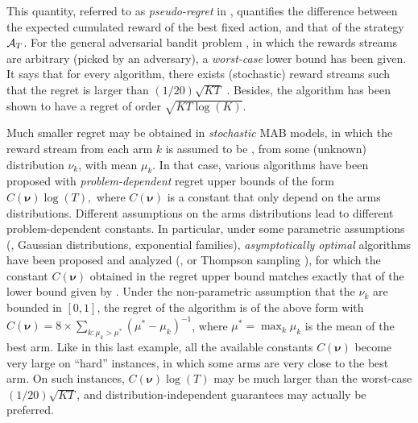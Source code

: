 \documentclass[12pt]{colt2018} %
\begin{document}
This quantity, referred to as \emph{pseudo-regret} in \cite{Bubeck12}, quantifies the difference between the expected cumulated reward of the best fixed action, and that of the strategy $\mathcal{A}_T$.
For the general adversarial bandit problem \citep{Auer02NonStochastic}, in which the rewards streams are arbitrary (picked by an adversary), a \emph{worst-case} lower bound has been given.
It says that for every algorithm, there exists (stochastic) reward streams such that the regret is larger than $(1/20)\sqrt{KT}$
\citep{Auer02NonStochastic}.
Besides, the \ExpThree{} algorithm has been shown to have a regret of order $\sqrt{KT\log(K)}$.


Much smaller regret may be obtained in \emph{stochastic} MAB models, in which the reward stream from each arm $k$ is assumed to be \iid, from some (unknown) distribution $\nu_k$, with mean $\mu_k$.
In that case, various algorithms have been proposed with \emph{problem-dependent} regret upper bounds of the form $C(\bm\nu) \log(T),$ where $C(\bm\nu)$ is a constant that only depend on the arms distributions.
Different assumptions on the arms distributions lead to different problem-dependent constants.
In particular, under some parametric assumptions (\eg, Gaussian distributions, exponential families), \emph{asymptotically optimal} algorithms have been proposed and analyzed (\eg, \KLUCB{} \citep{KLUCBJournal} or Thompson sampling \citep{AgrawalGoyal11,Kaufmann12Thompson}), for which the constant $C(\bm\nu)$ obtained in the regret upper bound matches exactly that of the lower bound given by \cite{LaiRobbins85}.
Under the non-parametric assumption that the $\nu_k$ are bounded in $[0,1]$, the regret of the \UCBone{} algorithm \citep{Auer02} is of the above form with $C(\bm\nu) = 8 \times \sum_{k : \mu_k > \mu^*} (\mu^* - \mu_k)^{-1}$, where $\mu^* = \max_k \mu_k$ is the mean of the best arm.
Like in this last example, all the available constants $C(\bm\nu)$ become very large on ``hard'' instances, in which some arms are very close to the best arm.
On such instances,  $C(\bm\nu)\log(T)$ may be much larger than the worst-case $(1/20)\sqrt{KT}$, and distribution-independent guarantees may actually be preferred.
\end{document}
